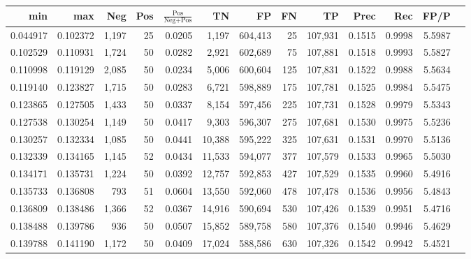\begin{tabular}{rrrrrrrrrrrrr}
\toprule
     min &      max &   Neg & Pos & $\frac{\text{Pos}}{\text{Neg}+\text{Pos}}$ &      TN &      FP &      FN &      TP &   Prec &    Rec &   FP/P \\
\midrule
0.044917 & 0.102372 & 1,197 &  25 &                                     0.0205 &   1,197 & 604,413 &      25 & 107,931 & 0.1515 & 0.9998 & 5.5987 \\
0.102529 & 0.110931 & 1,724 &  50 &                                     0.0282 &   2,921 & 602,689 &      75 & 107,881 & 0.1518 & 0.9993 & 5.5827 \\
0.110998 & 0.119129 & 2,085 &  50 &                                     0.0234 &   5,006 & 600,604 &     125 & 107,831 & 0.1522 & 0.9988 & 5.5634 \\
0.119140 & 0.123827 & 1,715 &  50 &                                     0.0283 &   6,721 & 598,889 &     175 & 107,781 & 0.1525 & 0.9984 & 5.5475 \\
0.123865 & 0.127505 & 1,433 &  50 &                                     0.0337 &   8,154 & 597,456 &     225 & 107,731 & 0.1528 & 0.9979 & 5.5343 \\
0.127538 & 0.130254 & 1,149 &  50 &                                     0.0417 &   9,303 & 596,307 &     275 & 107,681 & 0.1530 & 0.9975 & 5.5236 \\
0.130257 & 0.132334 & 1,085 &  50 &                                     0.0441 &  10,388 & 595,222 &     325 & 107,631 & 0.1531 & 0.9970 & 5.5136 \\
0.132339 & 0.134165 & 1,145 &  52 &                                     0.0434 &  11,533 & 594,077 &     377 & 107,579 & 0.1533 & 0.9965 & 5.5030 \\
0.134171 & 0.135731 & 1,224 &  50 &                                     0.0392 &  12,757 & 592,853 &     427 & 107,529 & 0.1535 & 0.9960 & 5.4916 \\
0.135733 & 0.136808 &   793 &  51 &                                     0.0604 &  13,550 & 592,060 &     478 & 107,478 & 0.1536 & 0.9956 & 5.4843 \\
0.136809 & 0.138486 & 1,366 &  52 &                                     0.0367 &  14,916 & 590,694 &     530 & 107,426 & 0.1539 & 0.9951 & 5.4716 \\
0.138488 & 0.139786 &   936 &  50 &                                     0.0507 &  15,852 & 589,758 &     580 & 107,376 & 0.1540 & 0.9946 & 5.4629 \\
0.139788 & 0.141190 & 1,172 &  50 &                                     0.0409 &  17,024 & 588,586 &     630 & 107,326 & 0.1542 & 0.9942 & 5.4521 \\

\end{tabular}
